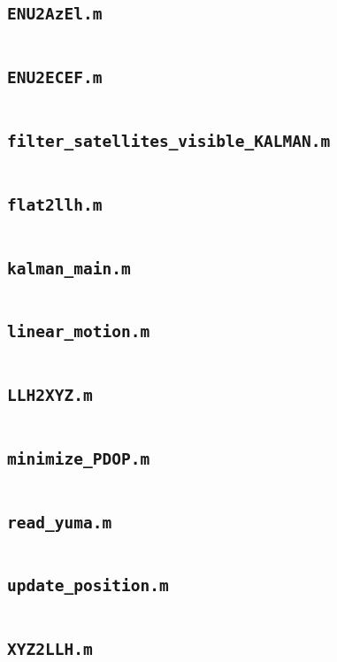 \subsection{\texttt{ENU2AzEl.m}}
\inputminted[fontsize=\footnotesize]{matlab}{code_kalman/ENU2AzEl.m}

\subsection{\texttt{ENU2ECEF.m}}
\inputminted[fontsize=\footnotesize]{matlab}{code_kalman/ENU2ECEF.m}

\subsection{\texttt{filter\_satellites\_visible\_KALMAN.m}}
\inputminted[fontsize=\footnotesize]{matlab}{code_kalman/filter_satellites_visible_KALMAN.m}

\subsection{\texttt{flat2llh.m}}
\inputminted[fontsize=\footnotesize]{matlab}{code_kalman/flat2llh.m}

\subsection{\texttt{kalman\_main.m}}
\inputminted[fontsize=\footnotesize]{matlab}{code_kalman/kalman_main.m}

\subsection{\texttt{linear\_motion.m}}
\inputminted[fontsize=\footnotesize]{matlab}{code_kalman/linear_motion.m}

\subsection{\texttt{LLH2XYZ.m}}
\inputminted[fontsize=\footnotesize]{matlab}{code_kalman/LLH2XYZ.m}

\subsection{\texttt{minimize\_PDOP.m}}
\inputminted[fontsize=\footnotesize]{matlab}{code_kalman/minimize_PDOP.m}

\subsection{\texttt{read\_yuma.m}}
\inputminted[fontsize=\footnotesize]{matlab}{code_kalman/read_yuma.m}

\subsection{\texttt{update\_position.m}}
\inputminted[fontsize=\footnotesize]{matlab}{code_kalman/update_position.m}

\subsection{\texttt{XYZ2LLH.m}}
\inputminted[fontsize=\footnotesize]{matlab}{code_kalman/XYZ2LLH.m}